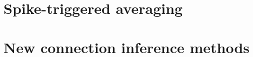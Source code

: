 \documentclass[a4paper, oneside, 11pt]{memoir}
\begin{document}



\chapter{Spike-triggered averaging}
\label{ch:STA}





\chapter{New connection inference methods}
\label{ch4}

\end{document}
